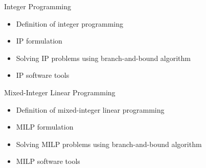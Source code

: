 \documentclass{beamer}
\begin{document}
    
        
        
        
    

    
        
    

\begin{frame}{Integer Programming}
    \begin{itemize}
        \item Definition of integer programming
        \item IP formulation
        \item Solving IP problems using branch-and-bound algorithm
        \item IP software tools
    \end{itemize}
\end{frame}

\begin{frame}{Mixed-Integer Linear Programming}
    \begin{itemize}
        \item Definition of mixed-integer linear programming
        \item MILP formulation
        \item Solving MILP problems using branch-and-bound algorithm
        \item MILP software tools
    \end{itemize}
\end{frame}
\end{document}
